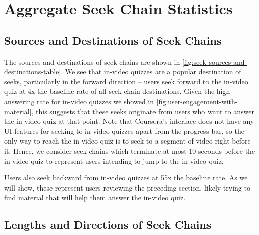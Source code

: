 \documentclass{sigchi}
\begin{document}
\section{Aggregate Seek Chain Statistics}

\subsection{Sources and Destinations of Seek Chains}

The sources and destinations of seek chains are shown in \autoref{fig:seek-sources-and-destinations-table}. We see that in-video quizzes are a popular destination of seeks, particularly in the forward direction -- users seek forward to the in-video quiz at 4x the baseline rate of all seek chain destinations. Given the high answering rate for in-video quizzes we showed in \autoref{fig:user-engagement-with-material}, this suggests that these seeks originate from users who want to answer the in-video quiz at that point. Note that Coursera's interface does not have any UI features for seeking to in-video quizzes apart from the progress bar, so the only way to reach the in-video quiz is to seek to a segment of video right before it. Hence, we consider seek chains which terminate at most 10 seconds before the in-video quiz to represent users intending to jump to the in-video quiz.

Users also seek backward from in-video quizzes at 55x the baseline rate. As we will show, these represent users reviewing the preceding section, likely trying to find material that will help them answer the in-video quiz. %





\subsection{Lengths and Directions of Seek Chains}
\end{document}
